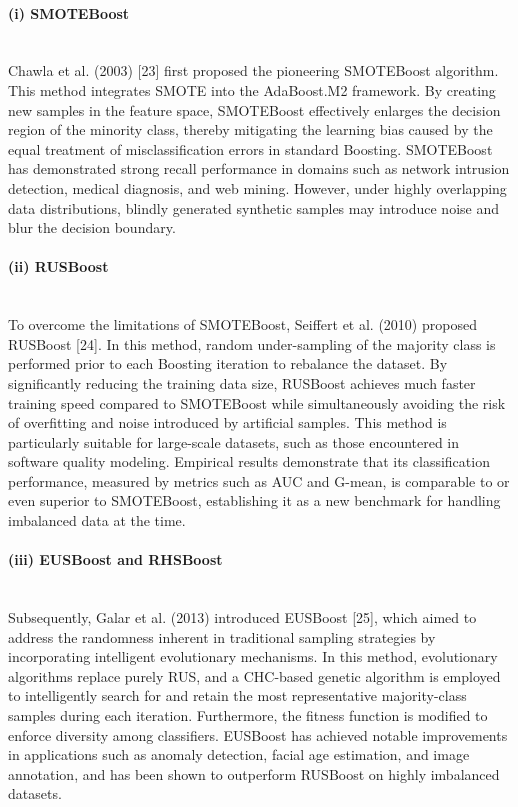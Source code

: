 \documentclass[sigconf]{acmart}
\begin{document}
\paragraph{(i) SMOTEBoost}~\\

Chawla et al. (2003) [23] first proposed the pioneering SMOTEBoost algorithm. This method integrates SMOTE into the AdaBoost.M2 framework. By creating new samples in the feature space, SMOTEBoost effectively enlarges the decision region of the minority class, thereby mitigating the learning bias caused by the equal treatment of misclassification errors in standard Boosting. SMOTEBoost has demonstrated strong recall performance in domains such as network intrusion detection, medical diagnosis, and web mining. However, under highly overlapping data distributions, blindly generated synthetic samples may introduce noise and blur the decision boundary. 

\paragraph{(ii) RUSBoost}~\\

To overcome the limitations of SMOTEBoost, Seiffert et al. (2010) proposed RUSBoost [24]. In this method, random under-sampling of the majority class is performed prior to each Boosting iteration to rebalance the dataset. By significantly reducing the training data size, RUSBoost achieves much faster training speed compared to SMOTEBoost while simultaneously avoiding the risk of overfitting and noise introduced by artificial samples. This method is particularly suitable for large-scale datasets, such as those encountered in software quality modeling. Empirical results demonstrate that its classification performance, measured by metrics such as AUC and G-mean, is comparable to or even superior to SMOTEBoost, establishing it as a new benchmark for handling imbalanced data at the time. 

\paragraph{(iii) EUSBoost and RHSBoost}~\\

Subsequently, Galar et al. (2013) introduced EUSBoost [25], which aimed to address the randomness inherent in traditional sampling strategies by incorporating intelligent evolutionary mechanisms. In this method, evolutionary algorithms replace purely RUS, and a CHC-based genetic algorithm is employed to intelligently search for and retain the most representative majority-class samples during each iteration. Furthermore, the fitness function is modified to enforce diversity among classifiers. EUSBoost has achieved notable improvements in applications such as anomaly detection, facial age estimation, and image annotation, and has been shown to outperform RUSBoost on highly imbalanced datasets. 
\end{document}
